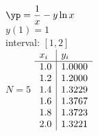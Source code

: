 {
$\yp = \displaystyle \frac{1}{x}-y\ln x$\\
$y(1)=1$\\
interval: $[1,2]$\\
$N=5$
}
{
	$\begin{array}{l | l}
		x_i & y_i    \\ \hline
		1.0 & 1.0000 \\
		1.2 & 1.2000 \\
		1.4 & 1.3229 \\
		1.6 & 1.3767 \\
		1.8 & 1.3723 \\
		2.0 & 1.3221 \\
	\end{array}$
}